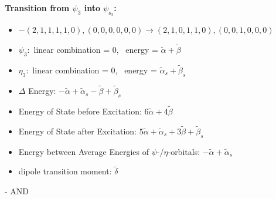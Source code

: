 \documentclass[12pt,a4paper]{article}
\begin{document}
        \noindent\textbf{Transition from $\psi_{3}$ into $\psi_{\text{s}_{3}}$:}
        \begin{itemize}
            \item $- (2, 1, 1, 1, 1, 0), (0, 0, 0, 0, 0, 0) \rightarrow (2, 1, 0, 1, 1, 0), (0, 0, 1, 0, 0, 0)$
        
            \item $\psi_{3}:$ linear combination = $0$, \
            energy = $\tilde{\alpha} + \tilde{\beta}$
            
            \item $\eta_{3}:$ linear combination = $0$, \
            energy = $\tilde{\alpha}_{s} + \tilde{\beta}_{s}$
            
                \item $\Delta$ Energy: $- \tilde{\alpha} + \tilde{\alpha}_{s} - \tilde{\beta} + \tilde{\beta}_{s}$
                \item Energy of State before Excitation: $6 \tilde{\alpha} + 4 \tilde{\beta}$
                \item Energy of State after Excitation: $5 \tilde{\alpha} + \tilde{\alpha}_{s} + 3 \tilde{\beta} + \tilde{\beta}_{s}$
                \item Energy between Average Energies of $\psi$-/$\eta$-orbitals: $- \tilde{\alpha} + \tilde{\alpha}_{s}$
            
            \item dipole transition moment: $\tilde{\delta}$
        
        \end{itemize}
        
 -  AND 
\end{document}
